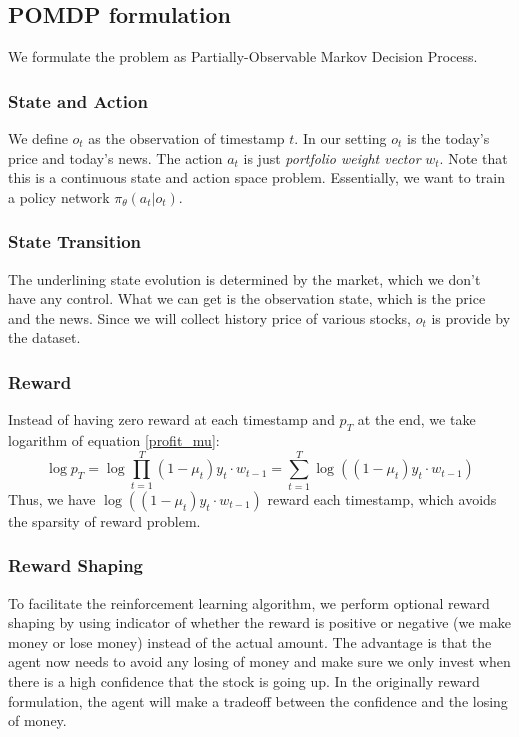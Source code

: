 \documentclass[11pt,a4paper]{article}
\begin{document}
\subsection{POMDP formulation}
We formulate the problem as Partially-Observable Markov Decision Process.
\subsubsection{State and Action}
We define $o_t$ as the observation of timestamp $t$. In our setting $o_t$ is the today's price and today's news. The action $a_{t}$ is just \textit{portfolio weight vector} $w_{t}$. 
Note that this is a continuous state and action space problem. 
Essentially, we want to train a policy network $\pi_\theta(a_t|o_t)$.

\subsubsection{State Transition}
The underlining state evolution is determined by the market, which we don't have any control. What we can get is the observation state, which is the price and the news. Since we will collect history price of various stocks, $o_t$ is provide by the dataset.

\subsubsection{Reward}
Instead of having zero reward at each timestamp and $p_T$ at the end, we take logarithm of equation \ref{profit_mu}:
\begin{dmath}
\log{p_T}=\log{\prod_{t=1}^{T}(1-\mu_t) y_t\cdot w_{t-1}}=\sum_{t=1}^{T}\log((1-\mu_t) y_t\cdot w_{t-1})
\end{dmath}
Thus, we have $\log((1-\mu_t) y_t\cdot w_{t-1})$ reward each timestamp, which avoids the sparsity of reward problem.
\subsubsection{Reward Shaping}
To facilitate the reinforcement learning algorithm, we perform optional reward shaping by using indicator of whether the reward is positive or negative (we make money or lose money) instead of the actual amount. The advantage is that the agent now needs to avoid any losing of money and make sure we only invest when there is a high confidence that the stock is going up. In the originally reward formulation, the agent will make a tradeoff between the confidence and the losing of money.
\end{document}
